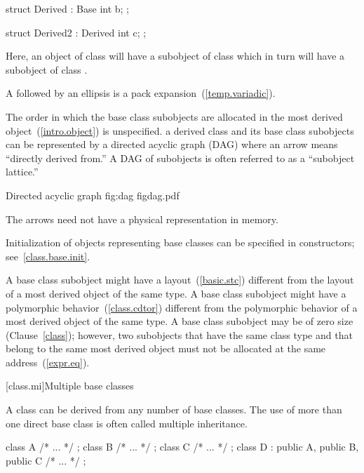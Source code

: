 \begin{codeblock}
struct Derived : Base {
  int b;
};
\end{codeblock}

\begin{codeblock}
struct Derived2 : Derived {
  int c;
};
\end{codeblock}

Here, an object of class  will have a subobject of class
 which in turn will have a subobject of class
.
\exitexample

\pnum
A  followed by an ellipsis is a pack
expansion~(\ref{temp.variadic}).

\pnum
The order in which the base class subobjects are allocated in the most
derived object~(\ref{intro.object}) is unspecified.
\enternote
{}%
%
a derived class and its base class subobjects can be represented by a
directed acyclic graph (DAG) where an arrow means ``directly derived
from.'' A DAG of subobjects is often referred to as a ``subobject
lattice.''

\begin{importgraphic}
{Directed acyclic graph}
{fig:dag}
{figdag.pdf}
\end{importgraphic}

\pnum
The arrows need not have a physical representation in memory.
\exitnote

\pnum
\enternote
Initialization of objects representing base classes can be specified in
constructors; see~\ref{class.base.init}.
\exitnote

\pnum
\enternote
A base class subobject might have a layout~(\ref{basic.stc}) different
from the layout of a most derived object of the same type. A base class
subobject might have a polymorphic behavior~(\ref{class.cdtor})
different from the polymorphic behavior of a most derived object of the
same type. A base class subobject may be of zero size (Clause~\ref{class});
however, two subobjects that have the same class type and that belong to
the same most derived object must not be allocated at the same
address~(\ref{expr.eq}).
\exitnote

[class.mi]{Multiple base classes}
%
%

\pnum
A class can be derived from any number of base classes.
\enternote
The use of more than one direct base class is often called multiple inheritance.
\exitnote
\enterexample
\begin{codeblock}
class A { /* ... */ };
class B { /* ... */ };
class C { /* ... */ };
class D : public A, public B, public C { /* ... */ };
\end{codeblock}
\exitexample

